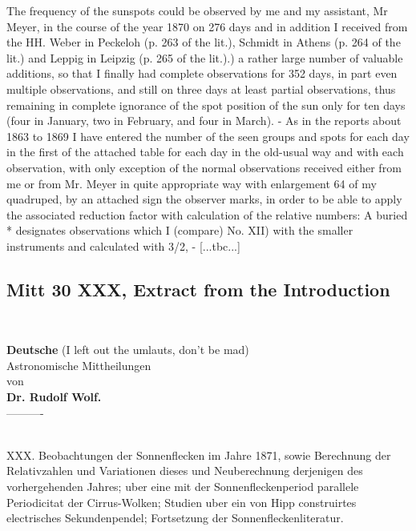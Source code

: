 \documentclass[12pt]{article}
\begin{document}
The frequency of the sunspots could be observed by me and my assistant, Mr Meyer, in the course of the year 1870 on 276 days and in addition I received from the HH. Weber in Peckeloh (p. 263 of the lit.), Schmidt in Athens (p. 264 of the lit.) and Leppig in Leipzig (p. 265 of the lit.).) a rather large number of valuable additions, so that I finally had complete observations for 352 days, in part even multiple observations, and still on three days at least partial observations, thus remaining in complete ignorance of the spot position of the sun only for ten days (four in January, two in February, and four in March). - As in the reports about 1863 to 1869 I have entered the number of the seen groups and spots for each day in the first of the attached table for each day in the old-usual way and with each observation, with only exception of the normal observations received either from me or from Mr. Meyer in quite appropriate way with enlargement 64 of my quadruped, by an attached sign the observer marks, in order to be able to apply the associated reduction factor with calculation of the relative numbers: A buried * designates observations which I (compare) No. XII) with the smaller instruments and calculated with 3/2, - [...tbc...]\\

\subsection{Mitt 30 XXX, Extract from the Introduction}\label{mitt:mitt 30 XXX intro}\\

{\centering
\textbf{Deutsche} (I left out the umlauts, don't be mad)\\
\huge{Astronomische Mittheilungen}\\
\footnotesize{von}\\
\textbf{Dr. Rudolf Wolf.}\\
----------\\
\par
}\\
\footnotesize{XXX. Beobachtungen der Sonnenflecken im Jahre 1871, sowie Berechnung der Relativzahlen und Variationen dieses und Neuberechnung derjenigen des vorhergehenden Jahres; uber eine mit der Sonnenfleckenperiod parallele Periodicitat der Cirrus-Wolken; Studien uber ein von Hipp construirtes electrisches Sekundenpendel; Fortsetzung der Sonnenfleckenliteratur.}\\
\end{document}
